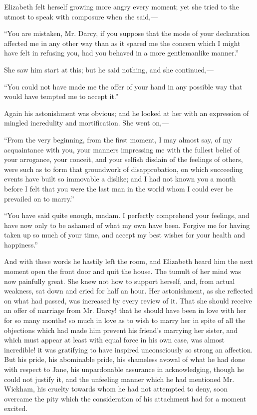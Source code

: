 \documentclass[12pt,openright]{book}
\begin{document}
Elizabeth felt herself growing more angry every moment; yet she tried to the utmost to speak with composure when she said,—

“You are mistaken, Mr. Darcy, if you suppose that the mode of your declaration affected me in any other way than as it spared me the concern which I might have felt in refusing you, had you behaved in a more gentlemanlike manner.”

She saw him start at this; but he said nothing, and she continued,—

“You could not have made me the offer of your hand in any possible way that would have tempted me to accept it.”

Again his astonishment was obvious; and he looked at her with an expression of mingled incredulity and mortification. She went on,—

“From the very beginning, from the first moment, I may almost say, of my acquaintance with you, your manners impressing me with the fullest belief of your arrogance, your conceit, and your selfish disdain of the feelings of others, were such as to form that groundwork of disapprobation, on which succeeding events have built so immovable a dislike; and I had not known you a month before I felt that you were the last man in the world whom I could ever be prevailed on to marry.”

“You have said quite enough, madam. I perfectly comprehend your feelings, and have now only to be ashamed of what my own have been. Forgive me for having taken up so much of your time, and accept my best wishes for your health and happiness.”

And with these words he hastily left the room, and Elizabeth heard him the next moment open the front door and quit the house. The tumult of her mind was now painfully great. She knew not how to support herself, and, from actual weakness, sat down and cried for half an hour. Her astonishment, as she reflected on what had passed, was increased by every review of it. That she should receive an offer of marriage from Mr. Darcy! that he should have been in love with her for so many months! so much in love as to wish to marry her in spite of all the objections which had made him prevent his friend’s marrying her sister, and which must appear at least with equal force in his own case, was almost incredible! it was gratifying to have inspired unconsciously so strong an affection. But his pride, his abominable pride, his shameless avowal of what he had done with respect to Jane, his unpardonable assurance in acknowledging, though he could not justify it, and the unfeeling manner which he had mentioned Mr. Wickham, his cruelty towards whom he had not attempted to deny, soon overcame the pity which the consideration of his attachment had for a moment excited.
\end{document}
